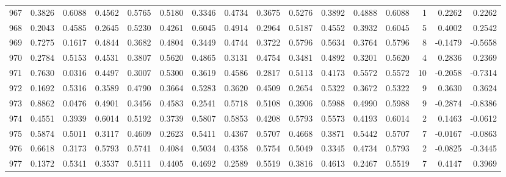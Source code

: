 \begin{tabular}{lrrrrrrrrrrrrrrr}
967 &      0.3826 &  0.6088 &  0.4562 &  0.5765 &  0.5180 &  0.3346 &  0.4734 &  0.3675 &  0.5276 &  0.3892 &   0.4888 &     0.6088 &      1 &                    0.2262 &                     0.2262 \\
968 &      0.2043 &  0.4585 &  0.2645 &  0.5230 &  0.4261 &  0.6045 &  0.4914 &  0.2964 &  0.5187 &  0.4552 &   0.3932 &     0.6045 &      5 &                    0.4002 &                     0.2542 \\
969 &      0.7275 &  0.1617 &  0.4844 &  0.3682 &  0.4804 &  0.3449 &  0.4744 &  0.3722 &  0.5796 &  0.5634 &   0.3764 &     0.5796 &      8 &                   -0.1479 &                    -0.5658 \\
970 &      0.2784 &  0.5153 &  0.4531 &  0.3807 &  0.5620 &  0.4865 &  0.3131 &  0.4754 &  0.3481 &  0.4892 &   0.3201 &     0.5620 &      4 &                    0.2836 &                     0.2369 \\
971 &      0.7630 &  0.0316 &  0.4497 &  0.3007 &  0.5300 &  0.3619 &  0.4586 &  0.2817 &  0.5113 &  0.4173 &   0.5572 &     0.5572 &     10 &                   -0.2058 &                    -0.7314 \\
972 &      0.1692 &  0.5316 &  0.3589 &  0.4790 &  0.3664 &  0.5283 &  0.3620 &  0.4509 &  0.2654 &  0.5322 &   0.3672 &     0.5322 &      9 &                    0.3630 &                     0.3624 \\
973 &      0.8862 &  0.0476 &  0.4901 &  0.3456 &  0.4583 &  0.2541 &  0.5718 &  0.5108 &  0.3906 &  0.5988 &   0.4990 &     0.5988 &      9 &                   -0.2874 &                    -0.8386 \\
974 &      0.4551 &  0.3939 &  0.6014 &  0.5192 &  0.3739 &  0.5807 &  0.5853 &  0.4208 &  0.5793 &  0.5573 &   0.4193 &     0.6014 &      2 &                    0.1463 &                    -0.0612 \\
975 &      0.5874 &  0.5011 &  0.3117 &  0.4609 &  0.2623 &  0.5411 &  0.4367 &  0.5707 &  0.4668 &  0.3871 &   0.5442 &     0.5707 &      7 &                   -0.0167 &                    -0.0863 \\
976 &      0.6618 &  0.3173 &  0.5793 &  0.5741 &  0.4084 &  0.5034 &  0.4358 &  0.5754 &  0.5049 &  0.3345 &   0.4734 &     0.5793 &      2 &                   -0.0825 &                    -0.3445 \\
977 &      0.1372 &  0.5341 &  0.3537 &  0.5111 &  0.4405 &  0.4692 &  0.2589 &  0.5519 &  0.3816 &  0.4613 &   0.2467 &     0.5519 &      7 &                    0.4147 &                     0.3969 \\

\end{tabular}

